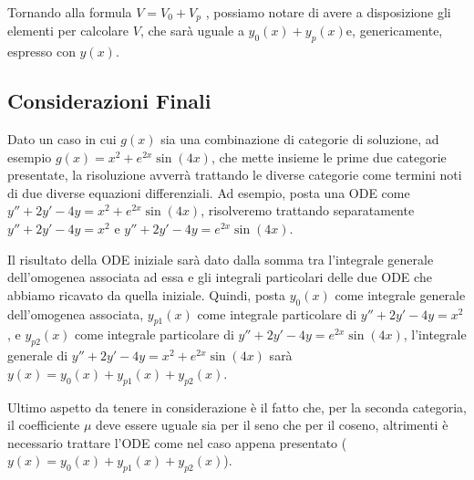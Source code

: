 \documentclass[a4paper,11pt]{article}
\begin{document}
\noindent Tornando alla formula $V=V_0+V_p$ , possiamo notare di avere a disposizione gli elementi per calcolare $V$, che sarà uguale a $y_0(x)+y_p(x)$\footnotemark[3] e, genericamente, espresso con $y(x)$.

\subsection{Considerazioni Finali}
Dato un caso in cui $g(x)$ sia una combinazione di categorie di soluzione, ad esempio $g(x)=x^2+e^{2x}\sin{(4x)}$, che mette insieme le prime due categorie presentate, la risoluzione avverrà trattando le diverse categorie come termini noti di due diverse equazioni differenziali. Ad esempio, posta una ODE come $y''+2y'-4y=x^2+e^{2x}\sin{(4x)}$, risolveremo trattando separatamente $y''+2y'-4y=x^2$ e $y''+2y'-4y=e^{2x}\sin{(4x)}$.

Il risultato della ODE iniziale sarà dato dalla somma tra l'integrale generale dell'omogenea associata ad essa e gli integrali particolari delle due ODE che abbiamo ricavato da quella iniziale. Quindi, posta $y_0(x)$ come integrale generale dell'omogenea associata, $y_{p1}(x)$ come integrale particolare di $y''+2y'-4y=x^2$, e $y_{p2}(x)$ come integrale particolare di $y''+2y'-4y=e^{2x}\sin{(4x)}$, l'integrale generale di $y''+2y'-4y=x^2+e^{2x}\sin{(4x)}$ sarà $y(x)=y_0(x)+y_{p1}(x)+y_{p2}(x)$.

Ultimo aspetto da tenere in considerazione è il fatto che, per la seconda categoria, il coefficiente $\mu$ deve essere uguale sia per il seno che per il coseno, altrimenti è necessario trattare l'ODE come nel caso appena presentato ($y(x)=y_0(x)+y_{p1}(x)+y_{p2}(x)$).
\end{document}
